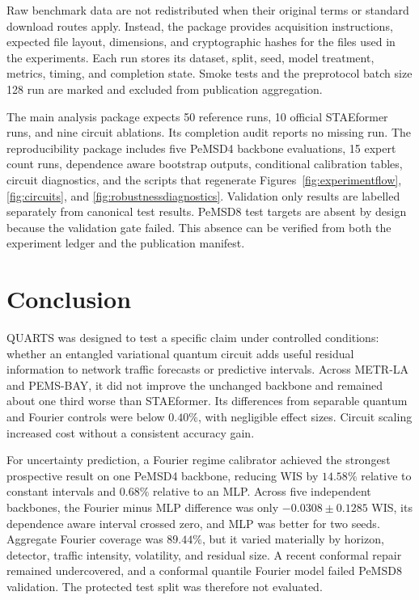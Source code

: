 \documentclass[pdflatex,sn-mathphys-num]{sn-jnl}
\begin{document}
Raw benchmark data are not redistributed when their original terms or standard download routes apply. Instead, the package provides acquisition instructions, expected file layout, dimensions, and cryptographic hashes for the files used in the experiments. Each run stores its dataset, split, seed, model treatment, metrics, timing, and completion state. Smoke tests and the preprotocol batch size 128 run are marked and excluded from publication aggregation.

The main analysis package expects 50 reference runs, 10 official STAEformer runs, and nine circuit ablations. Its completion audit reports no missing run. The reproducibility package includes five PeMSD4 backbone evaluations, 15 expert count runs, dependence aware bootstrap outputs, conditional calibration tables, circuit diagnostics, and the scripts that regenerate Figures~\ref{fig:experimentflow}, \ref{fig:circuits}, and \ref{fig:robustnessdiagnostics}. Validation only results are labelled separately from canonical test results. PeMSD8 test targets are absent by design because the validation gate failed. This absence can be verified from both the experiment ledger and the publication manifest.

\section{Conclusion}\label{sec:conclusion}

QUARTS was designed to test a specific claim under controlled conditions: whether an entangled variational quantum circuit adds useful residual information to network traffic forecasts or predictive intervals. Across METR-LA and PEMS-BAY, it did not improve the unchanged backbone and remained about one third worse than STAEformer. Its differences from separable quantum and Fourier controls were below \(0.40\%\), with negligible effect sizes. Circuit scaling increased cost without a consistent accuracy gain.

For uncertainty prediction, a Fourier regime calibrator achieved the strongest prospective result on one PeMSD4 backbone, reducing WIS by \(14.58\%\) relative to constant intervals and \(0.68\%\) relative to an MLP. Across five independent backbones, the Fourier minus MLP difference was only $-0.0308\pm0.1285$ WIS, its dependence aware interval crossed zero, and MLP was better for two seeds. Aggregate Fourier coverage was $89.44\%$, but it varied materially by horizon, detector, traffic intensity, volatility, and residual size. A recent conformal repair remained undercovered, and a conformal quantile Fourier model failed PeMSD8 validation. The protected test split was therefore not evaluated.
\end{document}
